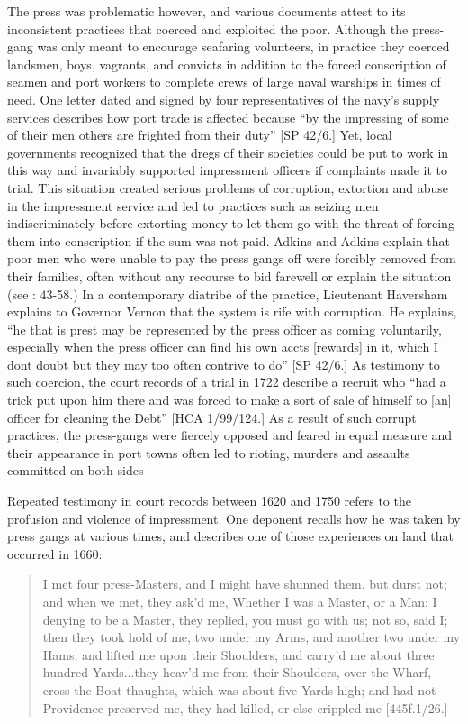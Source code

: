 The press was problematic however, and various documents attest to its inconsistent practices that coerced and exploited the poor. Although the press-gang was only meant to encourage seafaring volunteers, in practice they coerced landsmen, boys, vagrants, and convicts in addition to the forced conscription of seamen and port workers to complete crews of large naval warships in times of need. One letter dated \citealt{March1700} and signed by four representatives of the navy’s supply services describes how port trade is affected because “by the impressing of some of their men others are frighted from their duty” [SP 42/6.] Yet, local governments recognized that the dregs of their societies could be put to work in this way and invariably supported impressment officers if complaints made it to trial. This situation created serious problems of corruption, extortion and abuse in the impressment service and led to practices such as seizing men indiscriminately before extorting money to let them go with the threat of forcing them into conscription if the sum was not paid. Adkins and Adkins explain that poor men who were unable to pay the press gangs off were forcibly removed from their families, often without any recourse to bid farewell or explain the situation (see \citealt{AdkinsAdkins2008}: 43-58.) In a contemporary diatribe of the practice, Lieutenant Haversham explains to Governor Vernon that the system is rife with corruption. He explains, “he that is prest may be represented by the press officer as coming voluntarily, especially when the press officer can find his own accts [rewards] in it, which I dont doubt but they may too often contrive to do” [SP 42/6.] As testimony to such coercion, the court records of a trial in 1722 describe a recruit who “had a trick put upon him there and was forced to make a sort of sale of himself to [an] officer for cleaning the Debt” [HCA 1/99/124.] As a result of such corrupt practices, the press-gangs were fiercely opposed and feared in equal measure and their appearance in port towns often led to rioting, murders and assaults committed on both sides 

Repeated testimony in court records between 1620 and 1750 refers to the profusion and violence of impressment. One deponent recalls how he was taken by press gangs at various times, and describes one of those experiences on land that occurred in 1660:

\begin{quotation}
I met four press-Masters, and I might have shunned them, but durst not; and when we met, they ask’d me, Whether I was a Master, or a Man; I denying to be a Master, they replied, you must go with us; not so, said I; then they took hold of me, two under my Arms, and another two under my Hams, and lifted me upon their Shoulders, and carry’d me about three hundred Yards...they heav’d me from their Shoulders, over the Wharf, cross the Boat-thaughts, which was about five Yards high; and had not Providence preserved me, they had killed, or else crippled me [445f.1/26.]\end{quotation}

